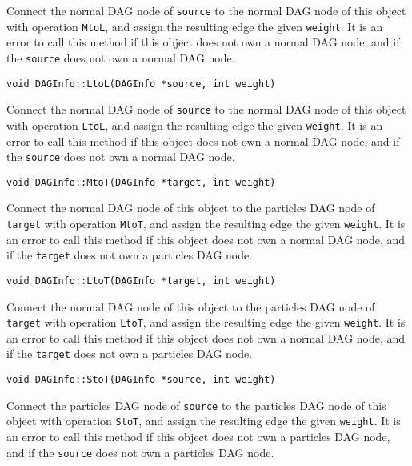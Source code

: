 \noindent Connect the normal DAG node of \texttt{source} to the normal DAG
node of this object with operation \texttt{MtoL}, and assign the resulting
edge the given \texttt{weight}. It is an error to call this method if this
object does not own a normal DAG node, and if the \texttt{source} does not
own a normal DAG node.

\begin{lstlisting}
void DAGInfo::LtoL(DAGInfo *source, int weight)
\end{lstlisting}

\noindent Connect the normal DAG node of \texttt{source} to the normal DAG
node of this object with operation \texttt{LtoL}, and assign the resulting
edge the given \texttt{weight}. It is an error to call this method if this
object does not own a normal DAG node, and if the \texttt{source} does not
own a normal DAG node.

\begin{lstlisting}
void DAGInfo::MtoT(DAGInfo *target, int weight)
\end{lstlisting}

\noindent Connect the normal DAG node of this object to the particles DAG
node of \texttt{target} with operation \texttt{MtoT}, and assign the
resulting edge the given \texttt{weight}. It is an error to call this method
if this object does not own a normal DAG node, and if the \texttt{target}
does not own a particles DAG node.

\begin{lstlisting}
void DAGInfo::LtoT(DAGInfo *target, int weight)
\end{lstlisting}

\noindent Connect the normal DAG node of this object to the particles DAG
node of \texttt{target} with operation \texttt{LtoT}, and assign the
resulting edge the given \texttt{weight}. It is an error to call this method
if this object does not own a normal DAG node, and if the \texttt{target}
does not own a particles DAG node.

\begin{lstlisting}
void DAGInfo::StoT(DAGInfo *source, int weight)
\end{lstlisting}

\noindent Connect the particles DAG node of \texttt{source} to the particles
DAG node of this object with operation \texttt{StoT}, and assign the
resulting edge the given \texttt{weight}. It is an error to call this method
if this object does not own a particles DAG node, and if the \texttt{source}
does not own a particles DAG node.

